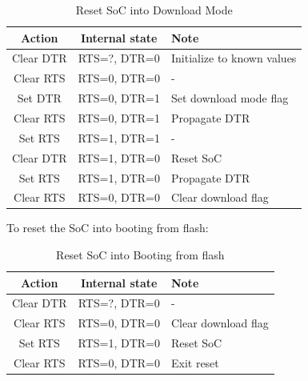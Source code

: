 \documentclass[main\_\_EN.tex]{subfiles}
\begin{document}
\begin{table}[H]
\centering
\caption{Reset SoC into Download Mode}
\label{tab:usbserialjtag-reset-soc-into-download-mode}

\begin{tabular} {|c|c|l|}\hline
\rowcolor{lightgray}
\textbf{Action} & \textbf{Internal state} & \textbf{Note} \\\hline

Clear DTR & RTS=?, DTR=0 & Initialize to known values \\\hline
Clear RTS & RTS=0, DTR=0 & - \\\hline
Set DTR & RTS=0, DTR=1 & Set download mode flag \\\hline
Clear RTS & RTS=0, DTR=1 & Propagate DTR \\\hline
Set RTS & RTS=1, DTR=1 & - \\\hline
Clear DTR & RTS=1, DTR=0 & Reset SoC \\\hline
Set RTS & RTS=1, DTR=0 & Propagate DTR \\\hline
Clear RTS & RTS=0, DTR=0 & Clear download flag\\\hline
\end{tabular}
\end{table}

To reset the SoC into booting from flash:

\begin{table}[H]
\centering
\caption{Reset SoC into Booting from flash}
\label{tab:usbserialjtag-reset-soc-into-booting}

\begin{tabular} {|c|c|l|}\hline
\rowcolor{lightgray}
\textbf{Action} & \textbf{Internal state} & \textbf{Note} \\\hline

Clear DTR & RTS=?, DTR=0 & - \\\hline
Clear RTS & RTS=0, DTR=0 &  Clear download flag \\\hline
Set RTS & RTS=1, DTR=0 & Reset SoC \\\hline
Clear RTS & RTS=0, DTR=0 & Exit reset \\\hline
\end{tabular}
\end{table}




\end{document}
